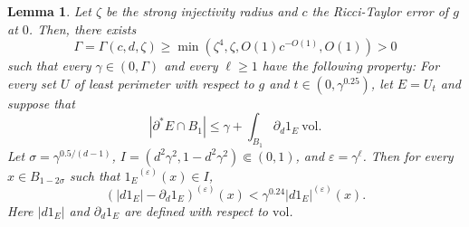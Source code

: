 \documentclass[reqno,12pt,letterpaper]{amsart}
\newcommand{\vol}{\mathrm{vol}}
\newtheorem{lemma}[theorem]{Lemma}
\theoremstyle{definition}
\numberwithin{equation}{section}
\begin{document}
\begin{lemma}\label{big mollify}
Let $\zeta$ be the strong injectivity radius and $c$ the Ricci-Taylor error of $g$ at $0$.
Then, there exists
\begin{equation}\label{estimates on Gamma}
\Gamma = \Gamma(c, d, \zeta) \geq \min(\zeta^4, \zeta, O(1)c^{-O(1)}, O(1)) > 0
\end{equation}
such that every $\gamma \in (0, \Gamma)$ and every $\ell \geq 1$ have the following property:
For every set $U$ of least perimeter with respect to $g$ and $t \in (0, \gamma^{0.25})$, let $E = U_t$ and suppose that
\begin{equation}\label{hypothesis on Giusti73}
|\partial^* E \cap B_1| \leq \gamma + \int_{B_1} \partial_d 1_E~\vol.
\end{equation}
Let $\sigma = \gamma^{0.5/(d-1)}$, $I = (d^2 \gamma^2, 1 - d^2\gamma^2) \Subset (0, 1)$, and $\varepsilon = \gamma^\ell$.
Then for every $x \in B_{1 - 2\sigma}$ such that ${1_E}^{(\varepsilon)}(x) \in I$,
$$(|d1_E| - \partial_d 1_E)^{(\varepsilon)}(x) < \gamma^{0.24} |d1_E|^{(\varepsilon)}(x).$$
Here $|d1_E|$ and $\partial_d 1_E$ are defined with respect to $\vol$.
\end{lemma}
\end{document}
